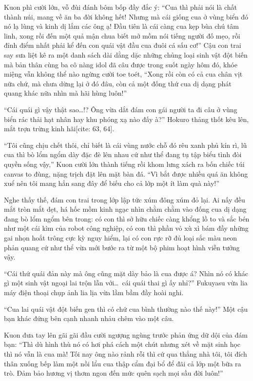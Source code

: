 \documentclass[../main.tex]{subfiles}
\begin{document}
Kuon phì cười lớn, vỗ đùi đánh bôm bốp đầy đắc ý: ``Cua thì phải nói là chất thành núi, mang về ăn ba đời không hết! Nhưng mà cái giống cua ở vùng biển đó nó lạ lùng và kinh dị lắm các ông ạ!  Đầu tiên là cái càng cua kẹp bùa chú tâm linh, xong rồi đến một quả mận chua biết mở mồm nói tiếng người đố mẹo, rồi đỉnh điểm nhất phải kể đến con quái vật đầu cua đuôi cá sấu cơ!''  Cậu con trai say sưa liệt kê ra một danh sách dài dằng dặc những chủng loại sinh vật đột biến mà bản thân cùng ba cô nàng idol đã câu được trong suốt ngày hôm đó, khóe miệng vẫn không thể nào ngừng cười toe toét, ``Xong rồi còn có cả cua chân vịt nữa chứ, mà chưa dừng lại ở đó đâu, còn cả một đống thứ cua dị dạng phát quang khác nữa nhìn mà hãi hùng luôn!''

``Cái quái gì vậy thật sao\dots!? Ông vừa dắt đám con gái người ta đi câu ở vùng biển rác thải hạt nhân hay khu phóng xạ nào đấy à?'' Hokuro thảng thốt kêu lên, mắt trợn trừng kinh hãi[cite: 63, 64].

``Tôi cũng chịu chết thôi, chỉ biết là cái vùng nước chỗ đó rêu xanh phủ kín rì, lũ cua thì bò lổm ngổm dày đặc đè lên nhau cứ như thể đang tụ tập biểu tình đòi quyền sống vậy,'' Kuon cười lớn thành tiếng rồi khom lưng xách ra bốn chiếc túi canvas to đùng, nặng trịch đặt lên mặt bàn đá. ``Vì bắt được nhiều quá ăn không xuể nên tôi mang hẳn sang đây để biếu cho cả lớp một ít làm quà này!''

Nghe thấy thế, đám con trai trong lớp lập tức xúm đông xúm đỏ lại. Ai nấy đều mắt tròn mắt dẹt, há hốc mồm kinh ngạc nhìn chằm chằm vào đống cua dị dạng đang bò lổm ngổm bên trong: có con thì sở hữu chiếc càng khổng lồ to và sắc bén như một cái kìm của robot công nghiệp, có con thì phần vỏ xù xì bám đầy những gai nhọn hoắt trông cực kỳ nguy hiểm, lại có con rực rỡ đủ loại sắc màu neon phản quang cứ như thể vừa mới bước ra từ một bộ phim hoạt hình viễn tưởng vậy.

``Cái thứ quái đản này mà ông cũng mặt dày bảo là cua được á? Nhìn nó có khác gì một sinh vật ngoại lai trộn lẫn với\dots\ cái quái thai gì ấy nhỉ?'' Fukuyasu vừa lia máy điện thoại chụp ảnh lia lịa vừa lầm bầm đầy hoài nghi.

``Cua lai quái vật đột biến gen thì có chứ cua bình thường nào thế này!'' Một cậu bạn khác đứng bên cạnh nhanh nhảu chêm vào một câu.

Kuon đưa tay lên gãi gãi đầu cười ngượng ngùng trước phản ứng dữ dội của đám bạn: ``Thì dù hình thù nó có hơi phá cách một chút nhưng xét về mặt sinh học thì nó vẫn là cua mà!  Tối nay ông nào rảnh rỗi thì cứ qua thẳng nhà tôi, tôi đích thân xuống bếp làm một nồi lẩu cua thập cẩm đại bổ để đãi cả lớp một bữa ra trò. Đảm bảo hương vị thơm ngon đến mức quên sạch mọi sầu đời luôn!''
\end{document}
